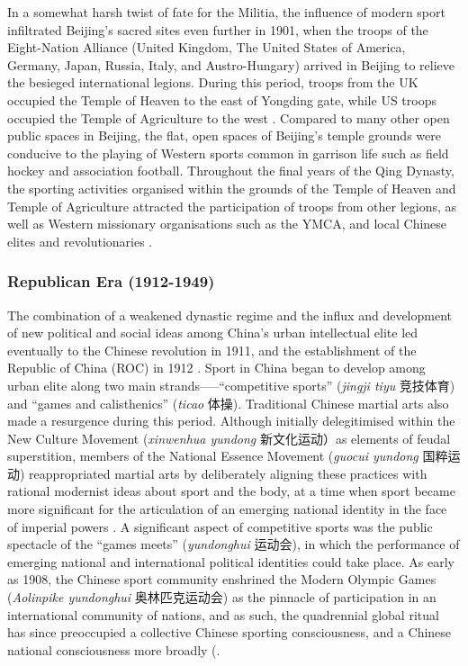 {In a somewhat harsh twist of fate for the Militia, the influence of modern sport infiltrated Beijing's sacred sites even further in 1901, when the troops of the Eight-Nation Alliance (United Kingdom, The United States of America, Germany, Japan, Russia, Italy, and Austro-Hungary) arrived in Beijing to relieve the besieged international legions.  During this period, troops from the UK occupied the Temple of Heaven to the east of Yongding gate, while US troops occupied the Temple of Agriculture to the west \citep{Brownell2008}. Compared to many other open public spaces in Beijing, the flat, open spaces of Beijing's temple grounds were conducive to the playing of Western sports common in garrison life such as field hockey and association football.  Throughout the final years of the Qing Dynasty, the sporting activities organised within the grounds of the Temple of Heaven and Temple of Agriculture attracted the participation of troops from other legions, as well as Western missionary organisations such as the YMCA, and local Chinese elites and revolutionaries \citep{Steel1985}.

\subsubsection{Republican Era (1912-1949)}
The combination of a weakened dynastic regime and the influx and development of new political and social ideas among China's urban intellectual elite led eventually to the Chinese revolution in 1911, and the establishment of the Republic of China (ROC) in 1912 \citep{Mitter2008}. Sport in China began to develop among urban elite along two main strands—--``competitive sports'' (\textit{jingji tiyu} 竞技体育) and ``games and calisthenics'' (\textit{ticao} 体操).  Traditional Chinese martial arts also made a resurgence during this period.  Although initially delegitimised within the New Culture Movement (\textit{xinwenhua yundong} 新文化运动）as elements of feudal superstition, members of the National Essence Movement (\textit{guocui yundong} 国粹运动) reappropriated martial arts by deliberately aligning these practices with rational modernist ideas about sport and the body, at a time when sport became more significant for the articulation of an emerging national identity in the face of imperial powers \citep[38]{Brownell1995}\citep[45]{Morris2004}.  A significant aspect of competitive sports was the public spectacle of the ``games meets'' (\textit{yundonghui} 运动会), in which the performance of emerging national and international political identities could take place.  As early as 1908, the Chinese sport community enshrined the Modern Olympic Games (\textit{Aolinpike yundonghui} 奥林匹克运动会) as the pinnacle of participation in an international community of nations, and as such, the quadrennial global ritual has since preoccupied a collective Chinese sporting consciousness, and a Chinese national consciousness more broadly (\citep{Burnett2009;Barme2009;Brownell2008;Morris2004;Xu2008}.

}
